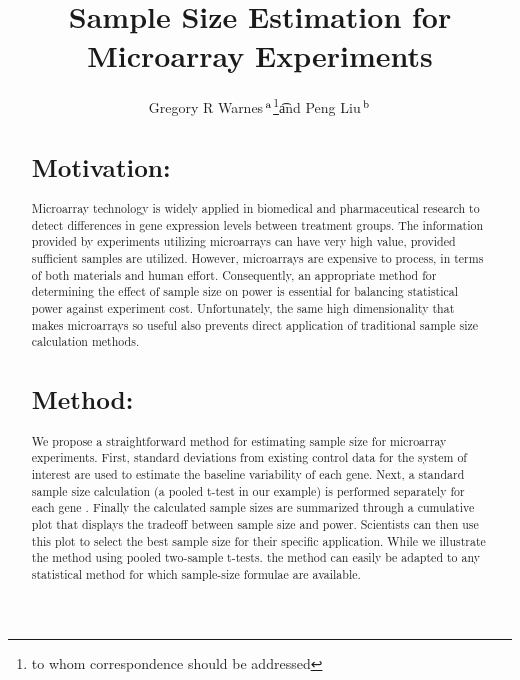 \documentclass{bioinfo}
\begin{document}

\title{Sample Size Estimation for Microarray Experiments}
\author{
  Gregory R Warnes\,$^{\rm a}$\footnote{to whom correspondence should
    be addressed}\t
  and
  Peng Liu\,$^{\rm b}$
}
\address{
  $^{\rm a}$Nonclinical Statistics, Pfizer Global Research and Development,
  Groton, CT 06340 \\
  $^{\rm b}$Department of Biological Statistics and Computational
  Biology, Cornell University, Ithaca, NY 14853
  }

\maketitle

\begin{abstract}

\section{Motivation:}

Microarray technology is widely applied in biomedical and
pharmaceutical research to detect differences in gene expression
levels between treatment groups.  The information provided by
experiments utilizing microarrays can have very high value, provided
sufficient samples are utilized.  However, microarrays are expensive
to process, in terms of both materials and human effort.
Consequently, an appropriate method for determining the effect of
sample size on power is essential for balancing statistical power
against experiment cost. Unfortunately, the same high
dimensionality that makes microarrays so useful also prevents direct
application of traditional sample size calculation methods.

\section{Method:}

We propose a straightforward method for estimating sample size for
microarray experiments. First, standard deviations from existing
control data for the system of interest are used to estimate the
baseline variability of each gene. Next, a standard sample size
calculation (a pooled t-test in our example) is performed separately
for each gene .  Finally the calculated sample sizes are summarized
through a cumulative plot that displays the tradeoff between sample
size and power. Scientists can then use this plot to select the best
sample size for their specific application.  While we illustrate the
method using pooled two-sample t-tests. the method can easily be
adapted to any statistical method for which sample-size formulae are
available.


\end{abstract}
\end{document}
